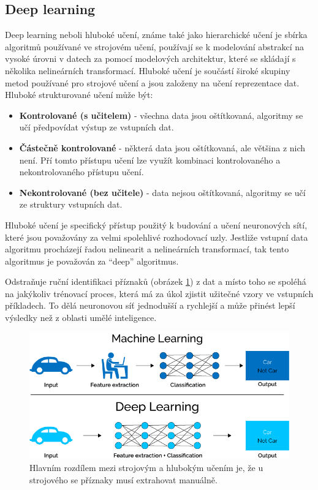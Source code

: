 \subsection{Deep learning}
Deep learning neboli hluboké učení, známe také jako hierarchické učení je sbírka algoritmů používané ve strojovém učení, používají se k modelování abstrakcí na vysoké úrovni v datech za pomocí modelových architektur, které se skládají s několika nelineárních transformací. Hluboké učení je součástí široké skupiny metod používané pro strojové učení a jsou založeny na učení reprezentace dat. Hluboké strukturované učení může být:
\begin{itemize}
  \item{\textbf{Kontrolované (s učitelem)} - všechna data jsou oštítkovaná, algoritmy se učí předpovídat výstup ze vstupních dat.}
  \item{\textbf{Částečně kontrolované} - některá data jsou oštítkovaná, ale většina z nich není. Pří tomto přístupu učení lze využít kombinaci kontrolovaného a nekontrolovaného přístupu učení.}
  \item{\textbf{Nekontrolované (bez učitele)} - data nejsou oštítkovaná, algoritmy se učí ze struktury vstupních dat.}
\end{itemize}
Hluboké učení je specifický přístup použitý k budování a učení neuronových sítí, které jsou považovány za velmi spolehlivé rozhodovací uzly. Jestliže vstupní data algoritmu procházejí řadou nelinearit a nelineárních transformací, tak tento algoritmus je považován za ``deep'' algoritmus. 

Odstraňuje ruční identifikaci příznaků (obrázek \ref{fig:ml_vs_ann}) z dat a místo toho se spoléhá na jakýkoliv trénovací proces, která má za úkol zjistit užitečné vzory ve vstupních příkladech. To dělá neuronovou síť jednodušší a rychlejší a může přinést lepší výsledky než z oblasti umělé inteligence.

\begin{figure}[H]
\centering
\includegraphics[width=.7\linewidth]{figures/ml_vs_ann}
\caption{Hlavním rozdílem mezi strojovým a hlubokým učením je, že u strojového se příznaky musí extrahovat manuálně. \cite{fig:mlvsann}}
\label{fig:ml_vs_ann}
\end{figure}

